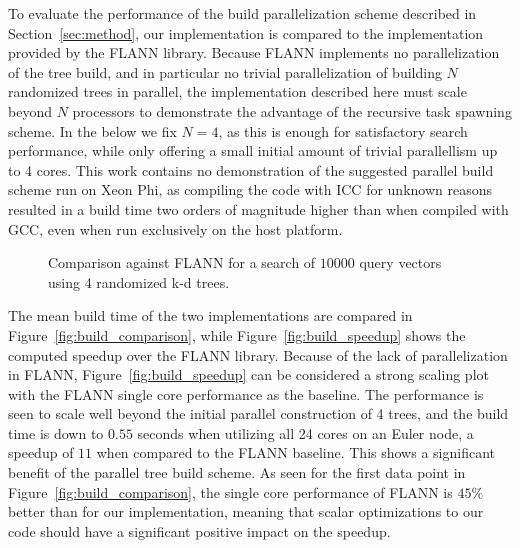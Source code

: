    To evaluate the performance of the build 
  parallelization scheme described in Section~\ref{sec:method}, our 
  implementation is compared to the implementation provided by the FLANN 
  library. Because FLANN implements no parallelization of the tree build, 
  and in particular no trivial parallelization of building $N$ randomized trees in 
  parallel, the implementation described here must scale beyond $N$ processors 
  to demonstrate the advantage of the recursive task
  spawning scheme. In the below we fix $N=4$, as this is enough for satisfactory search performance, while only offering a small initial amount of trivial parallellism up to 4 cores.
  This work contains no demonstration of the suggested 
  parallel build scheme run on Xeon Phi, as compiling the code with ICC for 
  unknown reasons resulted in a build time two orders of magnitude higher than 
  when compiled with GCC, even when run exclusively on the host platform.
  \begin{figure}[tb]
    \centering
    \resizebox{\columnwidth}{!}{}
    \caption{Comparison against FLANN for a search of $10000$ query vectors 
    using $4$ randomized k-d trees.}
    \label{fig:search_comparison}
  \end{figure}
  The mean build time of the two implementations are compared 
  in Figure~\ref{fig:build_comparison}, while Figure~\ref{fig:build_speedup} shows the computed speedup over the FLANN 
  library. Because of the lack of parallelization in FLANN, Figure~\ref{fig:build_speedup} can be considered a strong scaling plot with the FLANN single core performance as the baseline. %
  The performance is seen to scale well beyond the initial parallel construction of 4 trees, and the build time is down to $0.55$ seconds when utilizing all 24 cores on an Euler node, a speedup of $11$ when compared to the FLANN baseline. This shows a significant benefit of the parallel tree build scheme. As seen for the first data point in Figure~\ref{fig:build_comparison}, the single core performance of FLANN is $45\%$ better than for our implementation, meaning that scalar
  optimizations to our code should have a significant positive impact on the speedup. 

